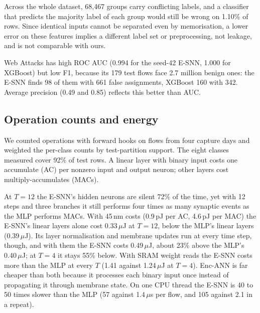 \documentclass[conference]{IEEEtran}
\begin{document}
Across the whole dataset, 68{,}467 groups carry conflicting labels, and a classifier that predicts the majority label of each group would still be wrong on 1.10\% of rows. Since identical inputs cannot be separated even by memorisation, a lower error on these features implies a different label set or preprocessing, not leakage, and is not comparable with ours.

Web Attacks has high ROC AUC (0.994 for the seed-42 E-SNN, 1.000 for XGBoost) but low F1, because its 179 test flows face 2.7 million benign ones: the E-SNN finds 98 of them with 661 false assignments, XGBoost 160 with 342. Average precision (0.49 and 0.85) reflects this better than AUC.

\subsection{Operation counts and energy}

We counted operations with forward hooks on flows from four capture days and weighted the per-class counts by test-partition support. The eight classes measured cover 92\% of test rows. A linear layer with binary input costs one accumulate (AC) per nonzero input and output neuron; other layers cost multiply-accumulates (MACs).


At $T = 12$ the E-SNN's hidden neurons are silent 72\% of the time, yet with 12 steps and three branches it still performs four times as many synaptic events as the MLP performs MACs. With 45\,nm costs (0.9\,pJ per AC, 4.6\,pJ per MAC) the E-SNN's linear layers alone cost 0.33\,$\mu$J at $T = 12$, below the MLP's linear layers (0.39\,$\mu$J). Its layer normalisation and membrane updates run at every time step, though, and with them the E-SNN costs 0.49\,$\mu$J, about 23\% above the MLP's 0.40\,$\mu$J; at $T = 4$ it stays 55\% below. With SRAM weight reads the E-SNN costs more than the MLP at every $T$ (1.41 against 1.24\,$\mu$J at $T = 4$). Enc-ANN is far cheaper than both because it processes each binary input once instead of propagating it through membrane state. On one CPU thread the E-SNN is 40 to 50 times slower than the MLP (57 against 1.4\,$\mu$s per flow, and 105 against 2.1 in a repeat).
\end{document}
